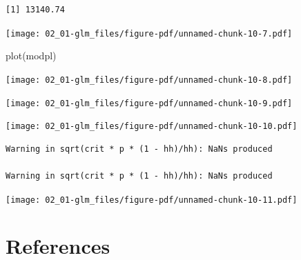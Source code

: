 \documentclass[
  letterpaper,
  DIV=11,
  numbers=noendperiod]{scrreprt}
\newenvironment{Shaded}{\begin{snugshade}}{\end{snugshade}}
\newcommand{\FunctionTok}[1]{\textcolor[rgb]{0.28,0.35,0.67}{#1}}
\newcommand{\NormalTok}[1]{\textcolor[rgb]{0.00,0.23,0.31}{#1}}
\newcommand{\SpecialCharTok}[1]{\textcolor[rgb]{0.37,0.37,0.37}{#1}}
\newlength{\cslhangindent}
\newenvironment{CSLReferences}[2] %
 {\begin{list}{}{%
  \setlength{\itemindent}{0pt}
  \setlength{\leftmargin}{0pt}
  \setlength{\parsep}{0pt}
  \ifodd #1
   \setlength{\leftmargin}{\cslhangindent}
   \setlength{\itemindent}{-1\cslhangindent}
  \fi
  \setlength{\itemsep}{#2\baselineskip}}}
 {\end{list}}
\begin{document}
\begin{verbatim}
[1] 13140.74
\end{verbatim}

\begin{Shaded}
\end{Shaded}

\texttt{[image: 02\_01-glm\_files/figure-pdf/unnamed-chunk-10-7.pdf]}

\begin{Shaded}
\begin{Highlighting}[]
 \FunctionTok{plot}\NormalTok{(modpl)}
\end{Highlighting}
\end{Shaded}

\texttt{[image: 02\_01-glm\_files/figure-pdf/unnamed-chunk-10-8.pdf]}

\texttt{[image: 02\_01-glm\_files/figure-pdf/unnamed-chunk-10-9.pdf]}

\texttt{[image: 02\_01-glm\_files/figure-pdf/unnamed-chunk-10-10.pdf]}

\begin{verbatim}
Warning in sqrt(crit * p * (1 - hh)/hh): NaNs produced

Warning in sqrt(crit * p * (1 - hh)/hh): NaNs produced
\end{verbatim}

\texttt{[image: 02\_01-glm\_files/figure-pdf/unnamed-chunk-10-11.pdf]}


\chapter*{References}\label{references}


\backmatter

\label{refs}
\begin{CSLReferences}{0}{1}
\end{CSLReferences}



\printindex
\end{document}
